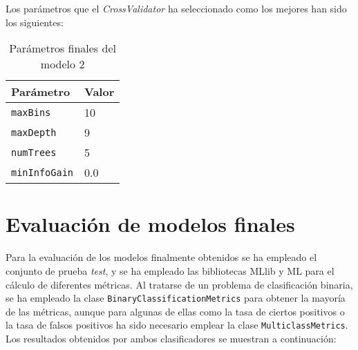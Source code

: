 \documentclass[12pt]{article}
\begin{document}
Los parámetros que el \textit{CrossValidator} ha seleccionado como los mejores han sido los siguientes:

\begin{table}[H]
    \centering
    \begin{tabular}{|p{}|p{}|}
        \hline Parámetro & Valor \\ \hline
        \texttt{maxBins} & 10 \\ \hline
        \texttt{maxDepth} & 9 \\ \hline
        \texttt{numTrees} & 5 \\ \hline
        \texttt{minInfoGain} & 0.0 \\ \hline
    \end{tabular}
    \caption{Parámetros finales del modelo 2}
    \label{tab:final_m2}
\end{table}

\section{Evaluación de modelos finales}
Para la evaluación de los modelos finalmente obtenidos se ha empleado el conjunto de prueba \textit{test}, y se ha empleado las bibliotecas MLlib y ML para el cálculo de diferentes métricas. Al tratarse de un problema de clasificación binaria, se ha empleado la clase \texttt{BinaryClassificationMetrics} para obtener la mayoría de las métricas, aunque para algunas de ellas como la tasa de ciertos positivos o la tasa de falsos positivos ha sido necesario emplear la clase \texttt{MulticlassMetrics}. Los resultados obtenidos por ambos clasificadores se muestran a continuación:
\end{document}
